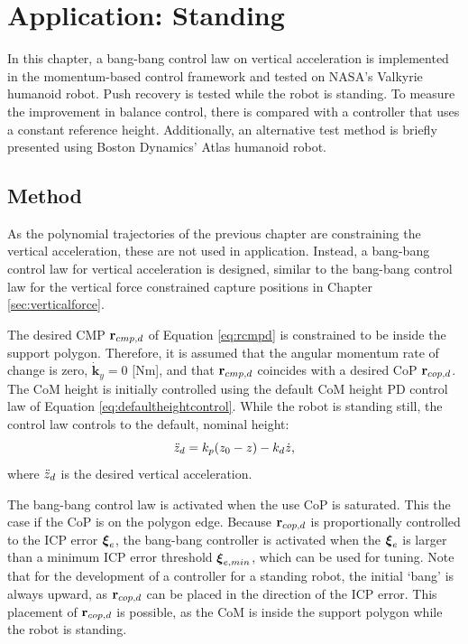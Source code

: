 \chapter{Application: Standing}\label{chap:standing}
In this chapter, a bang-bang control law on vertical acceleration is implemented in the momentum-based control framework and tested on NASA's Valkyrie \cite{radford2015valkyrie} humanoid robot. Push recovery is tested while the robot is standing. To measure the improvement in balance control, there is compared with a controller that uses a constant reference height. Additionally, an alternative test method is briefly presented using Boston Dynamics' Atlas humanoid robot.

\section{Method}
As the polynomial trajectories of the previous chapter are constraining the vertical acceleration, these are not used in application. Instead, a bang-bang control law for vertical acceleration is designed, similar to the bang-bang control law for the vertical force constrained capture positions in Chapter \ref{sec:verticalforce}.

The desired \ac{CMP} $\mathbf{r}_{cmp,d}$ of Equation \eqref{eq:rcmpd} is constrained to be inside the support polygon. Therefore, it is assumed that the angular momentum rate of change is zero, $\dot{\mathbf{k}}_y=0$ [Nm], and that $\mathbf{r}_{cmp,d}$ coincides with a desired \ac{CoP} $\mathbf{r}_{cop,d}$. The \ac{CoM} height is initially controlled using the default \ac{CoM} height PD control law of Equation \eqref{eq:defaultheightcontrol}.  While the robot is standing still, the control law controls to the default, nominal height:
\begin{equation}
\ddot{z}_d =k_p(z_0-z) - k_d\dot{z},
\end{equation}
where $\ddot{z}_d$ is the desired vertical acceleration. 

The bang-bang control law is activated when the use \ac{CoP} is saturated. This the case if the \ac{CoP} is on the polygon edge. Because $\mathbf{r}_{cop,d}$ is proportionally controlled to the \ac{ICP} error $\boldsymbol{\xi}_e$, the bang-bang controller is activated when the $\boldsymbol{\xi}_e$ is larger than a minimum \ac{ICP} error threshold $\boldsymbol{\xi}_{e,min}$, which can be used for tuning. Note that for the development of a controller for a standing robot, the initial `bang' is always upward, as $\mathbf{r}_{cop,d}$ can be placed in the direction of the \ac{ICP} error. This placement of $\mathbf{r}_{cop,d}$ is possible, as the \ac{CoM} is inside the support polygon while the robot is standing.

